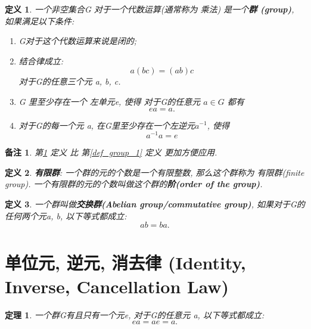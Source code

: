 \documentclass[utf8]{ctexbook}
\newtheorem{theorem}{定理}[section]
\newtheorem{definition}{定义}[section]
\newtheorem{memo}{备注}[section]
\begin{document}
\begin{definition}\label{def_group_2}
一个非空集合G 对于一个代数运算(通常称为 乘法) 是一个\textbf{群 (group)}, 如果满足以下条件:
\begin{enumerate}
\item[I.]{G对于这个代数运算来说是闭的;}
\item[II.]{结合律成立:
	\begin{equation}
		a(bc) = (ab) c 	
	\end{equation}
对于G的任意三个元 a, b, c.}
\item[IV.]{G 里至少存在一个 左单元e, 使得 对于G的任意元 $a \in G$ 都有
\begin{equation}
ea = a .
\end{equation}
}
\item[V.]{对于G的每一个元 a, 在G里至少存在一个左逆元$a^{-1}$, 使得
\begin{equation}
	a^{-1} a = e
\end{equation}
}
\end{enumerate}
\end{definition}

\begin{memo}
第\ref{def_group_2} 定义 比 第\ref{def_group_1} 定义 更加方便应用.
\end{memo}

\begin{definition}
\textbf{有限群}: 一个群的元的个数是一个有限整数, 那么这个群称为 有限群(finite group). 一个有限群的元的个数叫做这个群的\textbf{阶(order of the group)}.
\end{definition}

\begin{definition}
一个群叫做\textbf{交换群(Abelian group/commutative group)}, 如果对于G的任何两个元a, b, 以下等式都成立:
\begin{equation}
ab= ba .
\end{equation}

\end{definition}

\section{单位元, 逆元, 消去律 (Identity, Inverse, Cancellation Law)}

\begin{theorem}
一个群G有且只有一个元e, 对于G的任意元 a, 以下等式都成立:
\begin{equation}
ea = ae = a .
\end{equation}

\end{theorem}
\end{document}
